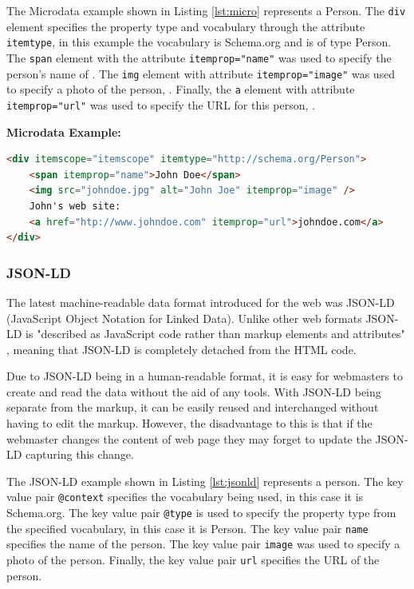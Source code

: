 \newpage
The Microdata example shown in Listing \ref{lst:micro} represents a Person. The \texttt{div} element specifies the property type and vocabulary through the attribute \texttt{itemtype}, in this example the vocabulary is Schema.org and is of type Person.  The \texttt{span} element with the attribute \texttt{itemprop="name"} was used to specify the person's name of . The \texttt{img} element with attribute \texttt{itemprop="image"} was used to specify a photo of the person, . Finally, the \texttt{a} element with attribute \texttt{itemprop="url"} was used to specify the URL for this person, .\newline


\noindent
\textbf{Microdata Example:}
{
\begin{lstlisting}[language=HTML,caption={A Microdata Example},captionpos=b,label={lst:micro},showstringspaces=false]
<div itemscope="itemscope" itemtype="http://schema.org/Person">
    <span itemprop="name">John Doe</span>
    <img src="johndoe.jpg" alt="John Joe" itemprop="image" />
    John's web site:
    <a href="htp://www.johndoe.com" itemprop="url">johndoe.com</a>
</div>
\end{lstlisting}
}

\subsubsection{JSON-LD}\label{sec:jsonld}
The latest machine-readable data format introduced for the web was JSON-LD (JavaScript Object Notation for Linked Data). Unlike other web formats JSON-LD is "described as JavaScript code rather than markup elements and attributes" \cite{sikos2015mastering}, meaning that JSON-LD is completely detached from the HTML code. 

Due to JSON-LD being in a human-readable format, it is easy for webmasters to create and read the data without the aid of any tools. With JSON-LD being separate from the markup, it can be easily reused and interchanged without having to edit the markup. However, the disadvantage to this is that if the webmaster changes the content of web page they may forget to update the JSON-LD capturing this change. 

The JSON-LD example shown in Listing \ref{lst:jsonld} represents a person. The key value pair \texttt{@context} specifies the vocabulary being used, in this case it is Schema.org. The key value pair \texttt{@type} is used to specify the property type from the specified vocabulary, in this case it is Person. The key value pair \texttt{name} specifies the name of the person. The key value pair \texttt{image} was used to specify a photo of the person. Finally, the key value pair \texttt{url} specifies the URL of the person.
\newline

